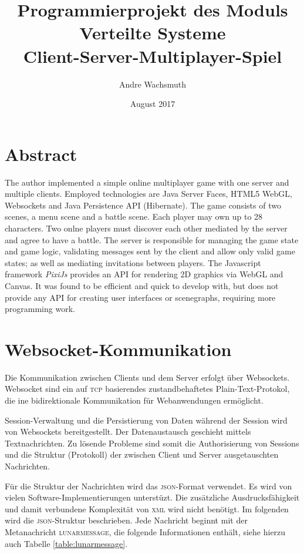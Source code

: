 \documentclass[ngerman,11pt]{report}
\author{Andre Wachsmuth}
\title{Programmierprojekt des Moduls Verteilte Systeme \\ Client-Server-Multiplayer-Spiel}
\date{August 2017}
\begin{document}
\maketitle
\tableofcontents

\chapter*{Abstract}

The author implemented a simple online multiplayer game with one server and
multiple clients. Employed technologies are Java Server Faces, HTML5 WebGL, Websockets
and Java Persistence API (Hibernate). The game consists of two scenes, a menu scene and
a battle scene. Each player may own up to 28 characters. Two onlne players must discover each
other mediated by the server and agree to have a battle. The server is responsible for 
managing the game state and game logic, validating messages sent by the client and allow only
valid game states; as well as mediating invitations between players. The Javascript framework
\textit{PixiJs} provides an API for rendering 2D graphics via WebGL and Canvas. It was found
to be efficient and quick to develop with, but does not provide any API for creating user
interfaces or scenegraphs, requiring more programming work.


\chapter{Websocket-Kommunikation}

Die Kommunikation zwischen Clients und dem Server erfolgt über Websockets. Websocket
sind ein auf \textsc{tcp} basierendes zustandbehaftetes Plain-Text-Protokol, die 
ine bidirektionale Kommunikation für Webanwendungen ermöglicht.

Session-Verwaltung und die Persistierung von Daten während der Session wird von Websockets bereitgestellt.
Der Datenaustausch geschieht mittels Textnachrichten. Zu lösende Probleme sind somit die Authorisierung
von Sessions und die Struktur (Protokoll) der zwischen Client und Server ausgetauschten Nachrichten.

Für die Struktur der Nachrichten wird das \textsc{json}-Format verwendet. Es wird von vielen
Software-Implementierungen unterstüzt. Die zusätzliche Ausdrucksfähigkeit und damit verbundene
Komplexität von \textsc{xml} wird nicht benötigt. Im folgenden wird die \textsc{json}-Struktur
beschrieben. Jede Nachricht beginnt mit der Metanachricht \textsc{lunarmessage}, die folgende
Informationen enthält, siehe hierzu auch Tabelle \ref{table:lunarmessage}.
\end{document}
